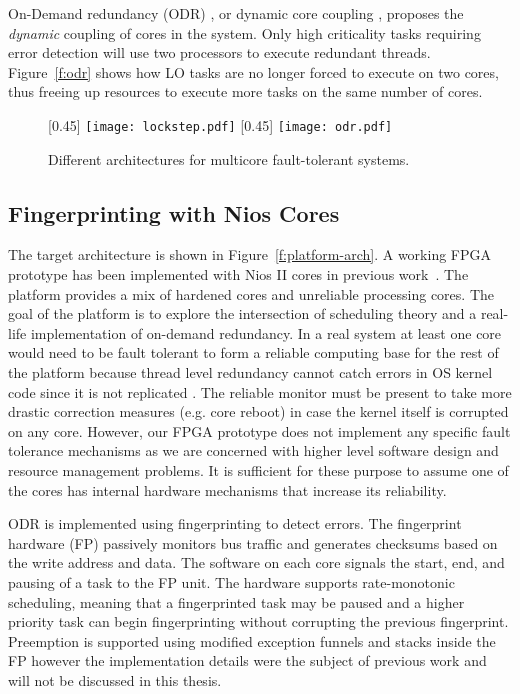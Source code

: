 	On-Demand redundancy (ODR) \cite{Meyer:CASES11,fu2013demand}, or dynamic core coupling \cite{lafrieda2007utilizing}, proposes the \emph{dynamic} coupling of cores in the system. 
	Only high criticality tasks requiring error detection will use two processors to execute redundant threads. 
	Figure~\ref{f:odr} shows how LO tasks are no longer forced to execute on two cores, thus freeing up resources to execute more tasks on the same number of cores.


\begin{figure}
\captionsetup[subfigure]{singlelinecheck=false}
\centering
{}[0.45\textwidth]
{
    \texttt{[image: lockstep.pdf]}
}%
\hfill
{}[0.45\textwidth]
{
    \texttt{[image: odr.pdf]}
}%
\caption{Different architectures for multicore fault-tolerant systems.}
\label{f:ft-arch}
\end{figure}


\subsection{Fingerprinting with Nios Cores}
\label{s:nios}
	The target architecture is shown in Figure~\ref{f:platform-arch}. 
	A working FPGA prototype has been implemented with Nios II cores in previous work~\cite{ugthesis}. 
	The platform provides a mix of hardened cores and unreliable processing cores. 
	The goal of the platform is to explore the intersection of scheduling theory and a real-life implementation of on-demand redundancy. 
	In a real system at least one core would need to be fault tolerant to form a reliable computing base for the rest of the platform because thread level redundancy cannot catch errors in OS kernel code since it is not replicated \cite{dobel2012watches}. 
	The reliable monitor must be present to take more drastic correction measures (e.g. core reboot) in case the kernel itself is corrupted on any core.
	However, our FPGA prototype does not implement any specific fault tolerance mechanisms as we are concerned with higher level software design and resource management problems. 
	It is sufficient for these purpose to assume one of the cores has internal hardware mechanisms that increase its reliability.



	ODR is implemented using fingerprinting \cite{Smolens:04} to detect errors. 
	The fingerprint hardware (FP) passively monitors bus traffic and generates checksums based on the write address and data.
	The software on each core signals the start, end, and pausing of a task to the FP unit.
	The hardware supports rate-monotonic scheduling, meaning that a fingerprinted task may be paused and a higher priority task can begin fingerprinting without corrupting the previous fingerprint.
	Preemption is supported using modified exception funnels and stacks inside the FP however the implementation details were the subject of previous work \cite{ugthesis} and will not be discussed in this thesis.
	
